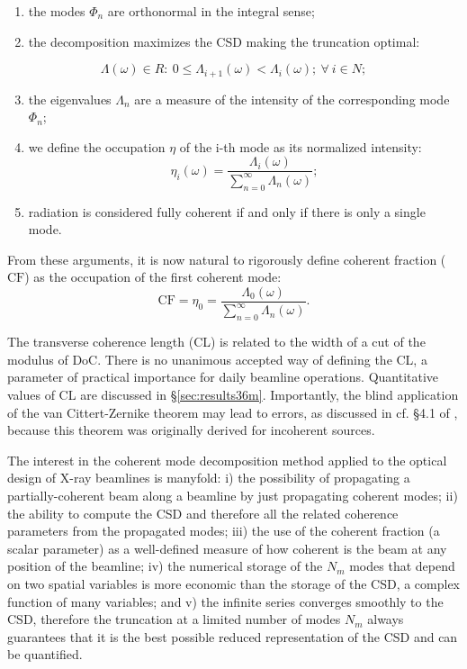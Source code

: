 \documentclass{iucr}
\begin{document}
\begin{enumerate}%
\item the modes $\Phi_n$ are orthonormal in the integral sense;
\item the decomposition maximizes the CSD making the truncation optimal:
\end{enumerate}
\begin{equation*}
\Lambda(\omega) \in {R}
:~0\leq \Lambda_{i+1}(\omega)<\Lambda_i(\omega);~\forall~i \in {N};
\end{equation*}
\begin{enumerate}%
\setcounter{enumi}{2}
\item the eigenvalues $\Lambda_n$ are a measure of the intensity of the corresponding mode $\Phi_{n}$; 
\item we define the occupation $\eta$ of the i-th mode as its normalized intensity: 
\begin{equation}
\eta_i(\omega) =\frac{\Lambda_i(\omega)}{\sum\limits_{n=0}^\infty{\Lambda_n(\omega)}};
\end{equation}
\item radiation is considered fully coherent if and only if there is only a single mode.
\end{enumerate}

From these arguments, it is now natural to rigorously define coherent fraction ($\text{CF}$) as the occupation of the first coherent mode:
\begin{equation}
\text{CF}=\eta_0=\frac{\Lambda_0(\omega)}{\sum\limits_{n=0}^\infty{\Lambda_n(\omega)}}. \label{eq:CF2D}
\end{equation}

The transverse coherence length (CL) is related to the width of a cut of the modulus of DoC. There is no unanimous accepted way of defining the CL, a parameter of practical importance for daily beamline operations. Quantitative values of CL are discussed in \S{\ref{sec:results36m}}. Importantly, the blind application of the van Cittert-Zernike theorem may lead to errors, as discussed in cf. §4.1 of \cite{geloni2008}, because this theorem was originally derived for incoherent sources. 

The interest in the coherent mode decomposition method applied to the optical design of X-ray beamlines is manyfold: 
i) the possibility of propagating a partially-coherent beam along a beamline by just propagating coherent modes; 
ii) the ability to compute the CSD and therefore all the related coherence parameters from the propagated modes;
iii) the use of the coherent fraction (a scalar parameter) as a well-defined measure of how coherent is the beam at any position of the beamline;
iv) the numerical storage of the $N_m$ modes that depend on two spatial variables is more economic than the storage of the CSD, a complex function of many variables;
and v) the infinite series converges smoothly to the CSD, therefore the truncation at a limited number of modes $N_m$ always guarantees that it is the best possible reduced representation of the CSD and can be quantified.
\end{document}
